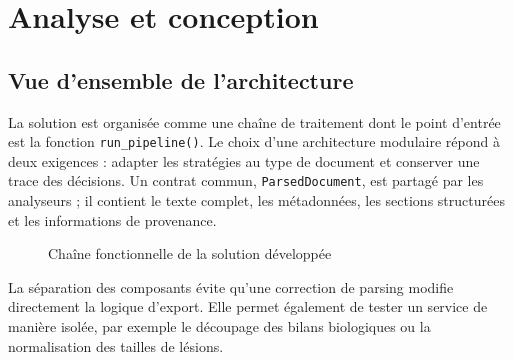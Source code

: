 \chapter{Analyse et conception}
\section{Vue d'ensemble de l'architecture}
La solution est organisée comme une chaîne de traitement dont le point d'entrée est la fonction \texttt{run\_pipeline()}. Le choix d'une architecture modulaire répond à deux exigences : adapter les stratégies au type de document et conserver une trace des décisions. Un contrat commun, \texttt{ParsedDocument}, est partagé par les analyseurs ; il contient le texte complet, les métadonnées, les sections structurées et les informations de provenance.

\begin{figure}[H]
\centering
{}
\caption{Chaîne fonctionnelle de la solution développée}
\label{fig:pipeline}
\end{figure}

La séparation des composants évite qu'une correction de parsing modifie directement la logique d'export. Elle permet également de tester un service de manière isolée, par exemple le découpage des bilans biologiques ou la normalisation des tailles de lésions.

